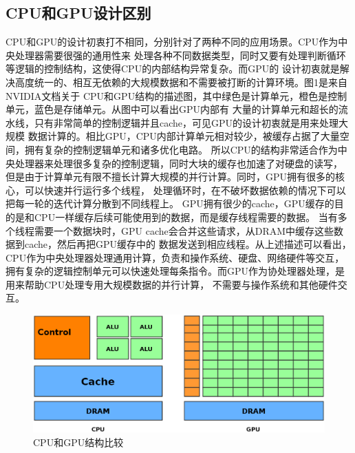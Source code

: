 \subsection{CPU和GPU设计区别}
CPU和GPU的设计初衷打不相同，分别针对了两种不同的应用场景。CPU作为中央处理器需要很强的通用性来
处理各种不同数据类型，同时又要有处理判断循环等逻辑的控制结构，这使得CPU的内部结构异常复杂。而GPU的
设计初衷就是解决高度统一的、相互无依赖的大规模数据和不需要被打断的计算环境。图1是来自NVIDIA文档关于
CPU和GPU结构的描述图，其中绿色是计算单元，橙色是控制单元，蓝色是存储单元。从图中可以看出GPU内部有
大量的计算单元和超长的流水线，只有非常简单的控制逻辑并且cache，可见GPU的设计初衷就是用来处理大规模
数据计算的。相比GPU，CPU内部计算单元相对较少，被缓存占据了大量空间，拥有复杂的控制逻辑单元和诸多优化电路。
所以CPU的结构非常适合作为中央处理器来处理很多复杂的控制逻辑，同时大块的缓存也加速了对硬盘的读写，
但是由于计算单元有限不擅长计算大规模的并行计算。同时，GPU拥有很多的核心，可以快速并行运行多个线程，
处理循环时，在不破坏数据依赖的情况下可以把每一轮的迭代计算分散到不同线程上。
GPU拥有很少的cache，GPU缓存的目的是和CPU一样缓存后续可能使用到的数据，而是缓存线程需要的数据。
当有多个线程需要一个数据块时，GPU cache会合并这些请求，从DRAM中缓存这些数据到cache，然后再把GPU缓存中的
数据发送到相应线程。从上述描述可以看出，CPU作为中央处理器处理通用计算，负责和操作系统、硬盘、网络硬件等交互，
拥有复杂的逻辑控制单元可以快速处理每条指令。而GPU作为协处理器处理，是用来帮助CPU处理专用大规模数据的并行计算，
不需要与操作系统和其他硬件交互。
\begin{figure}
\centering
\includegraphics[width=0.9\linewidth]{figure1.eps}
\caption{CPU和GPU结构比较}\label{figure1}
\end{figure}




